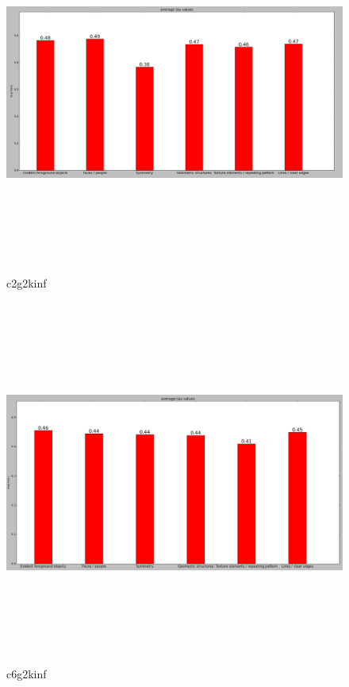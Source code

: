 		\begin{figure}[h] \label{c2g2kinf}
			\includegraphics[width=\linewidth,height=12cm,keepaspectratio]{Figures/c2g2kinf}
			\caption[c2g2kinf]
			{c2g2kinf}
		\end{figure}
		
		\begin{figure}[h] \label{c6g2kinf}
			\includegraphics[width=\linewidth,height=12cm,keepaspectratio]{Figures/c6g2kinf}
			\caption[c6g2kinf]
			{c6g2kinf}
		\end{figure}
		
